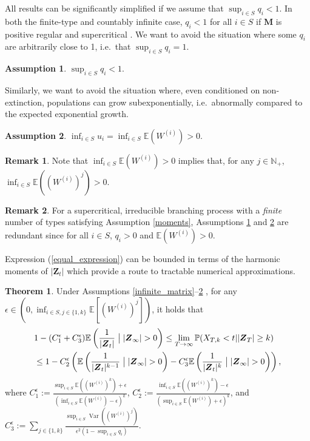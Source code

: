 \documentclass[preprint,3p,12pt]{elsarticle}
\theoremstyle{definition}
\newtheorem*{remark}{Remark}
\newtheorem{assumption}{Assumption}
\newtheorem{theorem}{Theorem}
\newcommand{\Var}{\operatorname{Var}}
\newcommand{\assumptions}{%
 \ref{infinite_matrix}--\ref{ass:E_W}
}
\begin{document}
 All results can be significantly simplified if we assume that $\sup_{i \in S} q_i < 1$. In both the finite-type and countably infinite case, $q_i < 1$ for all $i \in S$ if $\boldsymbol{M}$ is positive regular and supercritical \cite{hautphenne}. We want to avoid the situation where some $q_i$ are arbitrarily close to 1, i.e.\ that $\sup_{i \in S} q_i = 1$.
\begin{assumption}\label{ass:extinct}
    $\sup_{i \in S} q_i < 1$.
\end{assumption}
Similarly, we want to avoid the situation where, even conditioned on non-extinction, populations can grow subexponentially, i.e.\ abnormally compared to the expected exponential growth. 
\begin{assumption}\label{ass:E_W}
$ \inf_{i \in S} u_i =\inf_{i \in S} \mathbb{E}(W^{(i)}) > 0$.
\end{assumption}
\begin{remark}
    Note that $\inf_{i \in S} \mathbb{E}(W^{(i)}) > 0$ implies that, for any $j \in \mathbb{N}_+$, $\inf_{i \in S} \mathbb{E}((W^{(i)})^j)>0$.
\end{remark}
\begin{remark}
    For a supercritical, irreducible branching process with a \emph{finite} number of types satisfying Assumption \ref{moments}, Assumptions \ref{ass:extinct} and \ref{ass:E_W} are redundant since for all $i \in S$, $q_i > 0$ and $\mathbb{E}(W^{(i)}) > 0$. 
\end{remark}
Expression (\ref{equal_expression}) can be bounded in terms of the harmonic moments of $|\boldsymbol{Z}_t|$ which provide a route to tractable numerical approximations. 
\begin{theorem} \label{harmonic_thm}
Under Assumptions \assumptions, for any $\epsilon \in (0, \inf_{i \in S, j \in \{1,k\}}{\mathbb{E}[(W^{(i)})^j]})$, it holds that
    \begin{align*}
&1 -(C_1^{\epsilon}+C_3^{\epsilon})\mathbb{E}\left(\frac{1}
    {|\boldsymbol{Z}_t|}\bigm| |\boldsymbol{Z}_{\infty}| > 0\right)
\le \lim_{T \rightarrow \infty}\mathbb{P}(X_{T,k} < t| |\boldsymbol{Z}_T| \ge k ) \\
& \le
    1 - C_2^{\epsilon}\left(\mathbb{E}\left(\frac{1}{|\boldsymbol{Z}_t|^{k-1}}\bigm||\boldsymbol{Z}_{\infty}| > 0\right) - C_3^{\epsilon} \mathbb{E}\left(\frac{1}{|\boldsymbol{Z}_t|^{k}}\bigm||\boldsymbol{Z}_{\infty}| > 0\right)\right),
\end{align*}
where $C_1^{\epsilon} := \frac{\sup_{i \in S}\mathbb{E}((W^{(i)})^k)+\epsilon}
    {(\inf_{i \in S}\mathbb{E}(W^{(i)})-\epsilon)^k}$, $C_2^{\epsilon} := \frac{\inf_{i \in S}\mathbb{E}((W^{(i)})^k)-\epsilon}{(\sup_{i \in S}\mathbb{E}(W^{(i)})+\epsilon)^k}$, and $C_3^{\epsilon} := 
    \sum_{j \in \{1, k\}}\frac{\sup_{i \in S}{\Var((W^{(i)})^j)}}{ \epsilon^2(1 - \sup_{i \in S}q_i)}$.
\end{theorem}
\end{document}
